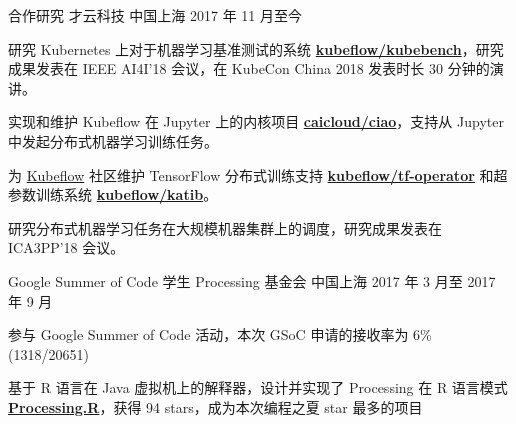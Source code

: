 

\begin{cventries}

  \cventry
    {合作研究} %
    {才云科技} %
    {中国上海} %
    {2017 年 11 月至今} %
    {
      \begin{cvitems} %
        \item 研究 Kubernetes 上对于机器学习基准测试的系统 \href{https://github.com/kubeflow/kubebench}{\bf kubeflow/kubebench}，研究成果发表在 IEEE AI4I'18 会议，在 KubeCon China 2018 发表时长 30 分钟的演讲。
        \item 实现和维护 Kubeflow 在 Jupyter 上的内核项目 \href{https://github.com/caicloud/ciao}{\bf caicloud/ciao}，支持从 Jupyter 中发起分布式机器学习训练任务。
        \item 为 \href{https://github.com/kubeflow/kubeflow}{Kubeflow} 社区维护 TensorFlow 分布式训练支持 \href{https://github.com/kubeflow/tf-operator}{\bf kubeflow/tf-operator} 和超参数训练系统 \href{https://github.com/kubeflow/katib}{\bf kubeflow/katib}。
        \item 研究分布式机器学习任务在大规模机器集群上的调度，研究成果发表在 ICA3PP'18 会议。
      \end{cvitems}
    }

  \cventry
    {Google Summer of Code 学生} %
    {Processing 基金会} %
    {中国上海} %
    {2017 年 3 月至 2017 年 9 月} %
    {
      \begin{cvitems} %
        \item 参与 Google Summer of Code 活动，本次 GSoC 申请的接收率为 6\%(1318/20651)
        \item 基于 R 语言在 Java 虚拟机上的解释器，设计并实现了 Processing 在 R 语言模式 \href{https://github.com/gaocegege/Processing.R}{\bf Processing.R}，获得 94 stars，成为本次编程之夏 star 最多的项目
        \item
      \end{cvitems}
    }

\end{cventries}
